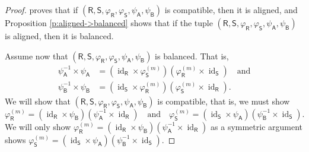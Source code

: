 \documentclass[11pt, letterpaper,final]{amsart}
\newcommand{\id}{\operatorname{id}}
\theoremstyle{definition}
\begin{document}
\begin{proof}
\cite[Lemma~4.2]{CDE} proves that if $(\mathsf{R}, \mathsf{S}, \varphi_\mathsf{R}, \varphi_\mathsf{S}, \psi_\mathsf{A}, \psi_\mathsf{B})$ is compatible, then it is aligned, and Proposition \ref{p:aligned->balanced} shows that if the tuple $(\mathsf{R}, \mathsf{S}, \varphi_\mathsf{R}, \varphi_\mathsf{S}, \psi_\mathsf{A}, \psi_\mathsf{B})$ is aligned, then it is balanced.

Assume now that $(\mathsf{R}, \mathsf{S}, \varphi_\mathsf{R}, \varphi_\mathsf{S}, \psi_\mathsf{A}, \psi_\mathsf{B})$ is balanced. That is,
\begin{align*}
\psi_\mathsf{A}^{-1} \times \psi_\mathsf{A} &= (\id_\mathsf{R} \times \varphi_\mathsf{S}^{(m)}) ( \varphi_\mathsf{R}^{(m)} \times \id_\mathsf{S}) \quad \text{and} \\
\psi_\mathsf{B}^{-1} \times \psi_\mathsf{B} &= (\id_\mathsf{S} \times \varphi_\mathsf{R}^{(m)}) ( \varphi_\mathsf{S}^{(m)} \times \id_\mathsf{R}).
\end{align*}
We will show that $(\mathsf{R}, \mathsf{S}, \varphi_\mathsf{R}, \varphi_\mathsf{S}, \psi_\mathsf{A}, \psi_\mathsf{B})$ is compatible, that is, we must show
$$
\varphi_\mathsf{R}^{(m)} = (\id_\mathsf{R} \times \psi_\mathsf{B})(\psi_\mathsf{A}^{-1} \times \id_\mathsf{R} ) \quad \text{and} \quad \varphi_\mathsf{S}^{(m)} = (\id_\mathsf{S} \times \psi_\mathsf{A})(\psi_\mathsf{B}^{-1} \times \id_\mathsf{S} ).
$$
We will only show $\varphi_\mathsf{R}^{(m)} = (\id_\mathsf{R} \times \psi_\mathsf{B})(\psi_\mathsf{A}^{-1} \times \id_\mathsf{R} )$ as a symmetric argument shows $\varphi_\mathsf{S}^{(m)} = (\id_\mathsf{S} \times \psi_\mathsf{A})(\psi_\mathsf{B}^{-1} \times \id_\mathsf{S} )$.


\end{proof}
\end{document}
